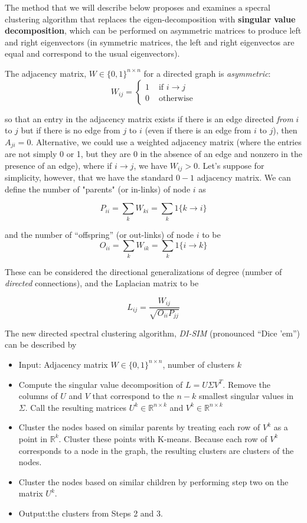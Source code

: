 The method that we will describe below proposes and examines a specral clustering algorithm that replaces the eigen-decomposition with \textbf{singular value decomposition}, which can be performed on asymmetric matrices to produce left and right eigenvectors (in symmetric matrices, the left and right eigenvectos are equal and correspond to the usual eigenvectors). 

The adjacency matrix, $W \in \{0, 1\}^{n \times n}$ for a directed graph is \emph{asymmetric}:
$$W_{ij} = \begin{cases} 1 & \text{ if } i \rightarrow j\\ 0 & \text{ otherwise} \end{cases}$$

so that an entry in the adjacency matrix exists if there is an edge directed \emph{from} $i$ to $j$ but if there is no edge from $j$ to $i$ (even if there is an edge from $i$ to $j$), then $A_{ji} = 0$. Alternative, we could use a weighted adjacency matrix (where the entries are not simply 0 or 1, but they are 0 in the absence of an edge and nonzero in the presence of an edge), where if $i \rightarrow j$, we have $W_{ij} > 0$. Let's suppose for simplicity, however, that we have the standard $0-1$ adjacency matrix. We can define the number of "parents" (or in-links) of node $i$ as

$$P_{ii} = \sum_k W_{ki} = \sum_{k} 1\{k \rightarrow i\}$$

and the number of ``offspring'' (or out-links) of node $i$ to be
$$O_{ii} = \sum_k W_{ik} = \sum_k 1\{i \rightarrow k\}$$

These can be considered the directional generalizations of degree (number of \emph{directed} connections), and the Laplacian matrix to be

$$L_{ij} = \frac{W_{ij}}{\sqrt{O_{ii}P_{jj}}}$$


The new directed spectral clustering algorithm, \emph{DI-SIM} (pronounced ``Dice 'em'') can be described by

\begin{itemize}
\item Input: Adjacency matrix $W \in \{0, 1\}^{n \times n}$, number of clusters $k$
\item Compute the singular value decomposition of $L = U \Sigma V^T$. Remove the columns of $U$ and $V$ that correspond to the $n - k$ smallest singular values in $\Sigma$. Call the resulting matrices $U^k \in \mathbb{R}^{n \times k}$ and $V^k \in \mathbb{R}^{n \times k}$ 
\item Cluster the nodes based on similar parents by treating each row of $V^k$ as a point in $\mathbb{R}^k$. Cluster these points with K-means. Because each row of $V^k$ corresponds to a node in the graph, the resulting clusters are clusters of the nodes.
\item Cluster the nodes based on similar children by performing step two on the matrix $U^k$.
\item Output:the clusters from Steps 2 and 3.
\end{itemize}

